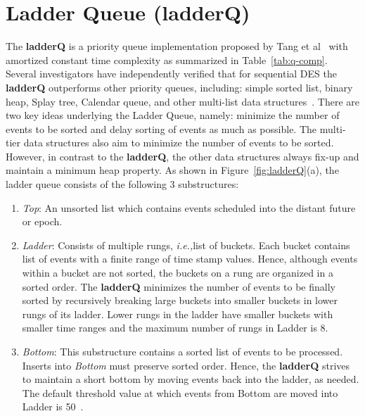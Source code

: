 \section{Ladder Queue (ladderQ)} 
The \textbf{ladderQ} is a priority queue implementation proposed by Tang et al~\cite{tang-05} with amortized constant time complexity as summarized in Table~\ref{tab:q-comp}. Several investigators have independently verified that for sequential DES the \textbf{ladderQ} outperforms other priority queues, including: simple sorted list, binary heap, Splay tree, Calendar queue, and other multi-list data structures~\cite{dickman-13,franceschini-15,tang-05}. There are two key ideas underlying the Ladder Queue, namely: minimize the number of events to be sorted and delay sorting of events as much as possible. The multi-tier data structures also aim to minimize the number of events to be sorted. However, in contrast to the \textbf{ladderQ}, the other data structures always fix-up and maintain a minimum heap property. As shown in Figure~\ref{fig:ladderQ}(a), the ladder queue consists of the following 3 substructures:
\begin{enumerate}[leftmargin=*,topsep=0pt]
\item \emph{Top}: An unsorted list which contains events scheduled into the distant future or epoch.

\item \emph{Ladder}: Consists of multiple rungs, \textit{i.e.,}list of buckets. Each bucket contains list of events with a finite range of time stamp values. Hence, although events within a bucket are not sorted, the buckets on a rung are organized in a sorted order. The \textbf{ladderQ} minimizes the number of events to be finally sorted by recursively breaking large buckets into smaller buckets in lower rungs of its ladder. Lower rungs in the ladder have smaller buckets with smaller time ranges and the maximum number of rungs in Ladder is 8.

\item \emph{Bottom}: This substructure contains a sorted list of events to be processed. Inserts into \emph{Bottom} must preserve sorted order. Hence, the \textbf{ladderQ} strives to maintain a short bottom by moving events back into the ladder, as needed. The default threshold value at which events from Bottom are moved into Ladder is 50~\cite{tang-05}.\end{enumerate} 

